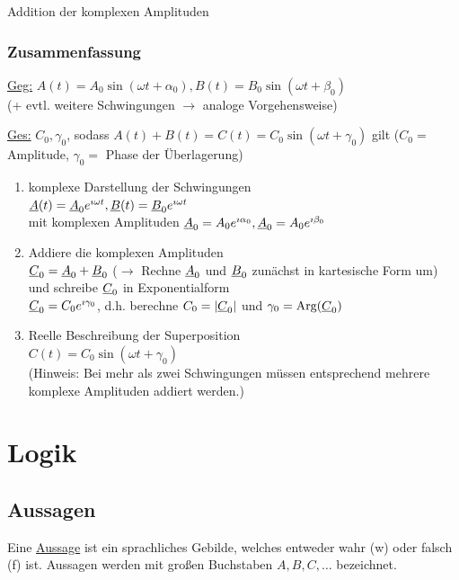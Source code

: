 Addition der komplexen Amplituden


\clearpage
\subsection{Zusammenfassung}
\ul{Geg:} $A(t)= A_0\sin(\omega t + \alpha_0), B(t) = B_0\sin(\omega t + \beta_0)$\\
(+ evtl. weitere Schwingungen $\rightarrow$ analoge Vorgehensweise)

\ul{Ges:} $C_0, \gamma_0$, sodass $A(t)+B(t) = C(t)= C_0\sin(\omega t+\gamma_0)$ gilt ($C_0 =$ Amplitude, $\gamma_0 = $ Phase der Überlagerung)

\begin{enumerate}[1.\text{ Schritt:}]
	\item komplexe Darstellung der Schwingungen\\
	$\underline{A}(t)= \underline{A}_0e^{\imath\omega t}, \underline{B}(t)= \underline{B}_0e^{\imath\omega t}$\\
	mit komplexen Amplituden $\underline{A}_0= A_0e^{\imath\alpha_0},\underline{A}_0= A_0e^{\imath\beta_0}$
	
	\item Addiere die komplexen Amplituden\\
	$\underline{C}_0 = \underline{A}_0 + \underline{B}_0$ ($\rightarrow$ Rechne $\underline{A}_0$ und $\underline{B}_0$ zunächst in kartesische Form um) und schreibe $\underline{C}_0$ in Exponentialform\\
	$\underline{C}_0 = C_0e^{\imath\gamma_0}$, d.h. berechne $C_0 = |\underline{C}_0|$ und $\gamma_0 = \mathbin\text{Arg}(\underline{C}_0)$
	
	\item Reelle Beschreibung der Superposition\\
	$C(t) = C_0\sin(\omega t + \gamma_0)$\\
	(Hinweis: Bei mehr als zwei Schwingungen müssen entsprechend mehrere komplexe Amplituden addiert werden.)
\end{enumerate}

\clearpage
\chapter{Logik}
\section{Aussagen}

\Def Eine \ul{Aussage} ist ein sprachliches Gebilde, welches entweder wahr (w) oder falsch (f) ist. Aussagen werden mit großen Buchstaben $A, B, C, \ldots$ bezeichnet.

